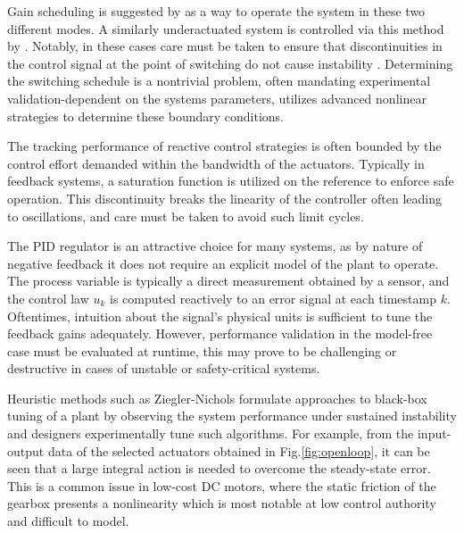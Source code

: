         Gain scheduling is suggested by \cite{refvem2019design}
        as a way to operate the system in these two different modes. A similarly underactuated system is controlled via this 
        method by \cite{wanggain}. Notably, in these cases care must be taken to ensure 
        that discontinuities in the control signal at the point of switching do not cause instability \cite{hespanha2002switching}.
        Determining the switching schedule is a nontrivial problem, often mandating experimental validation-dependent 
        on the systems parameters, \cite{RoboLimbo} utilizes advanced nonlinear strategies to determine these
        boundary conditions.
    
        The tracking performance of reactive control strategies is often bounded by the control effort 
        demanded within the bandwidth of the actuators. Typically in feedback systems, a saturation function 
        is utilized on the reference to enforce safe operation. This discontinuity breaks the linearity of the 
        controller often leading to oscillations, and care must be taken to avoid such limit cycles.
                
        The PID regulator is an attractive choice for many systems, as by nature of negative feedback it does not 
        require an explicit model of the plant to operate. The process variable is typically a direct measurement 
        obtained by a sensor, and the control law $u_k$ is computed reactively to an error signal at each timestamp $k$.
        Oftentimes, intuition about the signal's physical units is sufficient to tune the feedback gains adequately. 
        However, performance validation in the model-free case must be evaluated at runtime, this may prove to be 
        challenging or destructive in cases of unstable or safety-critical systems. 
            
        Heuristic methods such as Ziegler-Nichols formulate approaches to black-box tuning of a plant by observing the system 
        performance under sustained instability and designers experimentally tune such algorithms.
        For example, from the input-output data of the selected actuators obtained in Fig.\ref{fig:openloop}, 
        it can be seen that a large integral action is needed to overcome the steady-state error.
        This is a common issue in low-cost DC motors, where the static friction of the gearbox presents 
        a nonlinearity which is most notable at low control authority and difficult to model. 
        
